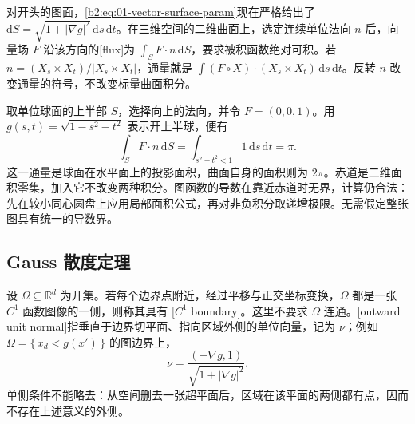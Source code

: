 \ProseParagraphBreak

对开头的图面，\eqref{b2:eq:01-vector-surface-param}现在严格给出了 \(\mathrm dS=\sqrt{1+|\nabla g|^2}\,\mathrm ds\,\mathrm dt\)。在三维空间的二维曲面上，选定连续单位法向 \(n\) 后，向量场 \(F\) 沿该方向的[flux]为 \(\int_SF\cdot n\,\mathrm dS\)，要求被积函数绝对可积。若 \(n=(X_s\times X_t)/|X_s\times X_t|\)，通量就是 \(\int (F\circ X)\cdot(X_s\times X_t)\,\mathrm ds\,\mathrm dt\)。反转 \(n\) 改变通量的符号，不改变标量曲面积分。

\ProseParagraphBreak

取单位球面的上半部 \(S\)，选择向上的法向，并令 \(F=(0,0,1)\)。用 \(g(s,t)=\sqrt{1-s^2-t^2}\) 表示开上半球，便有
\[
 \int_SF\cdot n\,\mathrm dS
 =\int_{s^2+t^2<1}1\,\mathrm ds\,\mathrm dt=\pi.
\]
这一通量是球面在水平面上的投影面积，曲面自身的面积则为 \(2\pi\)。赤道是二维面积零集，加入它不改变两种积分。图函数的导数在靠近赤道时无界，计算仍合法：先在较小同心圆盘上应用局部面积公式，再对非负积分取递增极限。无需假定整张图具有统一的导数界。

\subsection{Gauss 散度定理}
\label{b2:subsec:010203}

设 \(\Omega\subseteq\mathbb R^d\) 为开集。若每个边界点附近，经过平移与正交坐标变换，\(\Omega\) 都是一张 \(C^1\) 函数图像的一侧，则称其具有 [\(C^1\) boundary]。这里不要求 \(\Omega\) 连通。[outward unit normal]指垂直于边界切平面、指向区域外侧的单位向量，记为 \(\nu\)；例如 \(\Omega=\{\,x_d<g(x')\,\}\) 的图边界上，
\[
 \nu=\frac{(-\nabla g,1)}{\sqrt{1+|\nabla g|^2}}.
\]
单侧条件不能略去：从空间删去一张超平面后，区域在该平面的两侧都有点，因而不存在上述意义的外侧。

